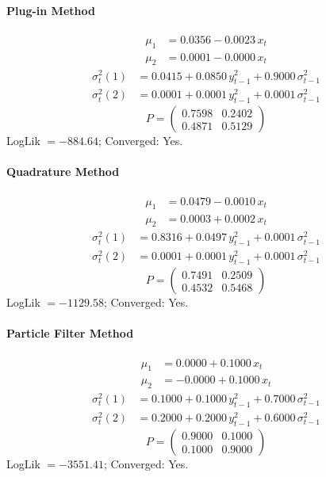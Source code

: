 \documentclass[11pt, a4paper]{article}
\begin{document}
\paragraph{Plug-in Method}
\begin{align}
\mu_{1} &= 0.0356 -0.0023\, x_t \\
\mu_{2} &= 0.0001 -0.0000\, x_t
\end{align}
\begin{align}
\sigma^2_{t}(1) &= 0.0415 + 0.0850\, y_{t-1}^2 + 0.9000\, \sigma^2_{t-1} \\
\sigma^2_{t}(2) &= 0.0001 + 0.0001\, y_{t-1}^2 + 0.0001\, \sigma^2_{t-1}
\end{align}
\begin{equation}
P = \begin{pmatrix} 0.7598 & 0.2402 \\ 0.4871 & 0.5129 \end{pmatrix}
\end{equation}
LogLik $= -884.64$; Converged: Yes.

\paragraph{Quadrature Method}
\begin{align}
\mu_{1} &= 0.0479 -0.0010\, x_t \\
\mu_{2} &= 0.0003 + 0.0002\, x_t
\end{align}
\begin{align}
\sigma^2_{t}(1) &= 0.8316 + 0.0497\, y_{t-1}^2 + 0.0001\, \sigma^2_{t-1} \\
\sigma^2_{t}(2) &= 0.0001 + 0.0001\, y_{t-1}^2 + 0.0001\, \sigma^2_{t-1}
\end{align}
\begin{equation}
P = \begin{pmatrix} 0.7491 & 0.2509 \\ 0.4532 & 0.5468 \end{pmatrix}
\end{equation}
LogLik $= -1129.58$; Converged: Yes.

\paragraph{Particle Filter Method}
\begin{align}
\mu_{1} &= 0.0000 + 0.1000\, x_t \\
\mu_{2} &= -0.0000 + 0.1000\, x_t
\end{align}
\begin{align}
\sigma^2_{t}(1) &= 0.1000 + 0.1000\, y_{t-1}^2 + 0.7000\, \sigma^2_{t-1} \\
\sigma^2_{t}(2) &= 0.2000 + 0.2000\, y_{t-1}^2 + 0.6000\, \sigma^2_{t-1}
\end{align}
\begin{equation}
P = \begin{pmatrix} 0.9000 & 0.1000 \\ 0.1000 & 0.9000 \end{pmatrix}
\end{equation}
LogLik $= -3551.41$; Converged: Yes.
\end{document}
